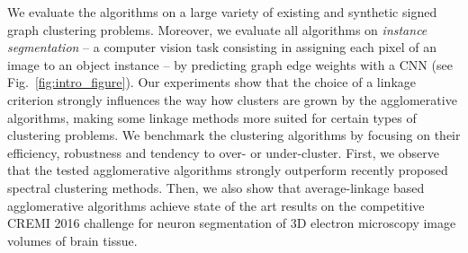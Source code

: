We evaluate the algorithms on a large variety of existing and synthetic signed graph clustering problems. 
Moreover, we evaluate all algorithms on \emph{instance segmentation} -- a computer vision task consisting in assigning each pixel of an image to an object instance -- by predicting graph edge weights with a CNN (see Fig.~\ref{fig:intro_figure}).
Our experiments show that the choice of a linkage criterion strongly influences the way how clusters are grown by the agglomerative algorithms, making some linkage methods more suited for certain types of clustering problems.
We benchmark the clustering algorithms by focusing on their efficiency, robustness and tendency to over- or under-cluster. 
First, we observe that the tested agglomerative algorithms strongly outperform recently proposed spectral clustering methods. Then,  we also show that average-linkage based agglomerative algorithms achieve state of the art results on the competitive CREMI 2016 challenge for neuron segmentation of 3D electron microscopy image volumes of brain tissue. 








